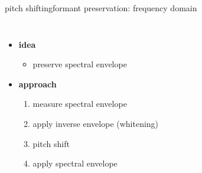         \begin{frame}{pitch shifting}{formant preservation: frequency domain}
           \begin{columns}
                    \begin{itemize}
                        \item \textbf{idea}
                            \begin{itemize}
                                \item   preserve spectral envelope
                            \end{itemize}
                        \bigskip
                        \pause
                        \item \textbf{approach}
                            \begin{enumerate}
                                \item   measure spectral envelope
                                \item   apply inverse envelope (whitening)
                                \item   pitch shift
                                \item   apply spectral envelope
                            \end{enumerate}
                  \end{itemize}
            \end{columns}
        \end{frame}
